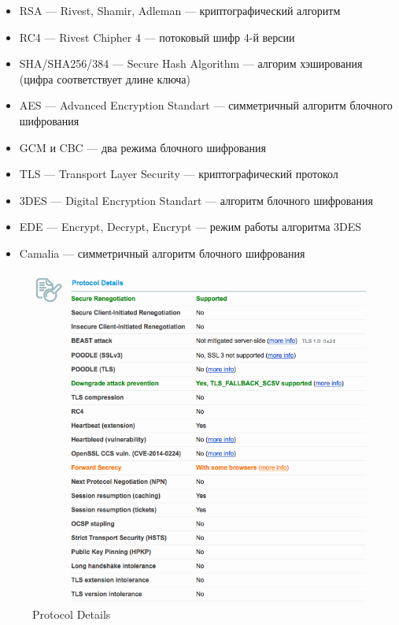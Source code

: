 \documentclass[utf8x, 12pt]{G7-32}
\begin{document}
\begin{itemize}
	\item RSA --- Rivest, Shamir, Adleman  --- криптографический алгоритм
	\item RC4 --- Rivest Chipher 4 --- потоковый шифр 4-й версии
	\item SHA/SHA256/384 --- Secure Hash Algorithm --- алгорим хэширования (цифра соответствует длине ключа)
	\item AES --- Advanced Encryption Standart --- симметричный алгоритм блочного шифрования
	\item GCM и CBC --- два режима блочного шифрования
	\item TLS --- Transport Layer Security --- криптографический протокол
	\item 3DES --- Digital Encryption Standart --- алгоритм блочного шифрования
	\item EDE --- Encrypt, Decrypt, Encrypt --- режим работы алгоритма 3DES
	\item Camalia --- симметричный алгоритм блочного шифрования
\end{itemize}

\newpage


\begin{figure}[hhh!]
	\begin{center}
		\includegraphics[width=14cm]{img/best4}
	\end{center}
	\vspace{-5mm}\caption{Protocol Details}
\end{figure}
\end{document}
